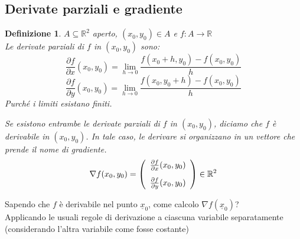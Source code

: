 \documentclass{scrreprt}
\newtheorem{defn}{Definizione}
\newenvironment{definition}{\begin{mdframed}[backgroundcolor=Ivory2]\begin{defn}}{\end{defn}\end{mdframed}}
\begin{document}
\subsection{Derivate parziali e gradiente}
\begin{definition}
	$A \subseteq \mathbb{R}^2$ aperto, $(x_0,y_0) \in A$ e $f: A \to \mathbb{R}$\\
	Le derivate parziali di $f$ in $(x_0,y_0)$ sono:
	\begin{equation}
		\frac{\partial f}{\partial x}(x_0,y_0) = \lim_{h \to 0} \frac{f(x_0+h,y_0)-f(x_0,y_0)}{h}
	\end{equation}
	\begin{equation}
		\frac{\partial f}{\partial y}(x_0,y_0) = \lim_{h \to 0} \frac{f(x_0,y_0+h)-f(x_0,y_0)}{h}
	\end{equation}
	Purché i limiti esistano finiti.

	Se esistono entrambe le derivate parziali di $f$ in $(x_0,y_0)$, diciamo che $f$ è derivabile in $(x_0,y_0)$.
	In tale caso, le derivare si organizzano in un vettore che prende il nome di gradiente.
	\begin{equation}
		\nabla f(x_0,y_0) = \left( \begin{array}[]{c} \frac{\partial f}{\partial x}(x_0,y_0) \\[2ex] \frac{\partial f}{\partial y}(x_0,y_0) \end{array} \right) \in \mathbb{R}^2
	\end{equation}
\end{definition}
Sapendo che $f$ è derivabile nel punto $\underline{x}_0$, come calcolo $\nabla f(\underline{x}_0)$?\\
Applicando le usuali regole di derivazione a ciascuna variabile separatamente (considerando l'altra variabile come fosse costante)

\end{document}
